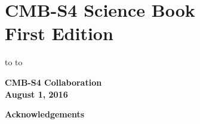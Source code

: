 \documentclass[titlepage]{tcibook}
\begin{document}


\def\bibname{References}

%

\raggedbottom


\parindent=0pt
\parskip=8pt
\setlength{\evensidemargin}{0pt}
\setlength{\oddsidemargin}{0pt}
\setlength{\marginparsep}{0.0in}
\setlength{\marginparwidth}{0.0in}
\marginparpush=0pt


\renewcommand{\chapname}{chap:intro_}
\renewcommand{\chapterdir}{.}
\renewcommand{\arraystretch}{1.25}
\addtolength{\arraycolsep}{-3pt}

\chapter*{CMB-S4 Science Book\\ First Edition}
\vskip -9.5pt
\hbox to
\vskip-6.5pt
\hbox to


  \begin{center}
   {\Large\bf
      CMB-S4 Collaboration\\
      \bigskip
      August 1, 2016
   }
%   
%
 \end{center}
\eject


\clearpage

\clearpage

\setcounter{page}{1}



\begin{center}
  {\Large \bf Acknowledgements}
\end{center}
\bigskip
\end{document}
